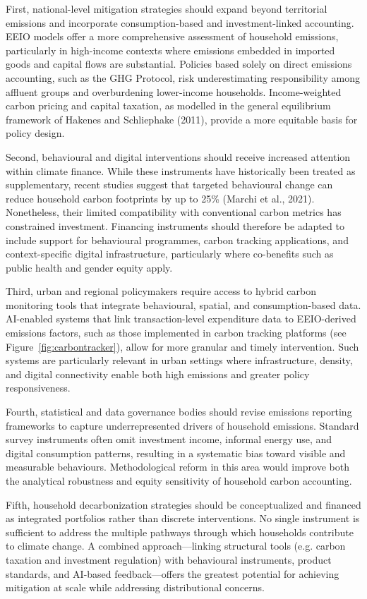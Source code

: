 \documentclass[12pt,a4paper]{article}%
\begin{document}
First, national-level mitigation strategies should expand beyond territorial emissions and incorporate consumption-based and investment-linked accounting. EEIO models offer a more comprehensive assessment of household emissions, particularly in high-income contexts where emissions embedded in imported goods and capital flows are substantial. Policies based solely on direct emissions accounting, such as the GHG Protocol, risk underestimating responsibility among affluent groups and overburdening lower-income households. Income-weighted carbon pricing and capital taxation, as modelled in the general equilibrium framework of Hakenes and Schliephake (2011), provide a more equitable basis for policy design.

Second, behavioural and digital interventions should receive increased attention within climate finance. While these instruments have historically been treated as supplementary, recent studies suggest that targeted behavioural change can reduce household carbon footprints by up to 25\% (Marchi et al., 2021). Nonetheless, their limited compatibility with conventional carbon metrics has constrained investment. Financing instruments should therefore be adapted to include support for behavioural programmes, carbon tracking applications, and context-specific digital infrastructure, particularly where co-benefits such as public health and gender equity apply.

Third, urban and regional policymakers require access to hybrid carbon monitoring tools that integrate behavioural, spatial, and consumption-based data. AI-enabled systems that link transaction-level expenditure data to EEIO-derived emissions factors, such as those implemented in carbon tracking platforms (see Figure~\ref{fig:carbontracker}), allow for more granular and timely intervention. Such systems are particularly relevant in urban settings where infrastructure, density, and digital connectivity enable both high emissions and greater policy responsiveness.

Fourth, statistical and data governance bodies should revise emissions reporting frameworks to capture underrepresented drivers of household emissions. Standard survey instruments often omit investment income, informal energy use, and digital consumption patterns, resulting in a systematic bias toward visible and measurable behaviours. Methodological reform in this area would improve both the analytical robustness and equity sensitivity of household carbon accounting.

Fifth, household decarbonization strategies should be conceptualized and financed as integrated portfolios rather than discrete interventions. No single instrument is sufficient to address the multiple pathways through which households contribute to climate change. A combined approach—linking structural tools (e.g. carbon taxation and investment regulation) with behavioural instruments, product standards, and AI-based feedback—offers the greatest potential for achieving mitigation at scale while addressing distributional concerns. 
\end{document}
